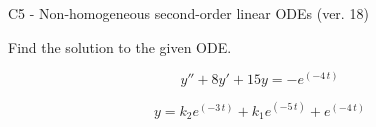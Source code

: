 \begin{exercise}
  \begin{exerciseTitle}C5 - Non-homogeneous second-order linear ODEs (ver. 18)\end{exerciseTitle}
  \begin{exerciseStatement}
    
Find the solution to the given ODE.

    
\[y''+8y'+15y = -e^{\left(-4 \, t\right)}\]

  \end{exerciseStatement}
  \begin{exerciseAnswer}
    
\[y= k_{2} e^{\left(-3 \, t\right)} + k_{1} e^{\left(-5 \, t\right)} + e^{\left(-4 \, t\right)}\]

  \end{exerciseAnswer}
\end{exercise}
